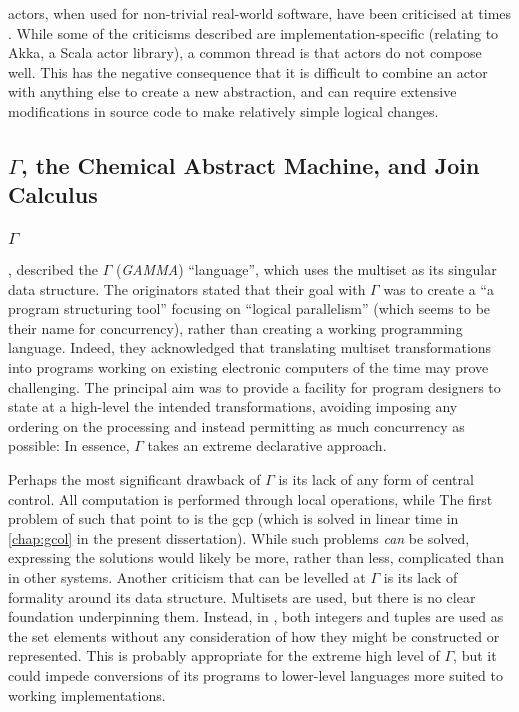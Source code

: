\Glspl{actor}, when used for non-trivial real-world software, have been criticised at times \eg{} \cite{Welsh2013,Stucchio2013}.  While some of the criticisms described are implementation-specific (relating to Akka, a Scala \gls{actor} library), a common thread is that \glspl{actor} do not compose well.  This has the negative consequence that it is difficult to combine an \gls{actor} with anything else to create a new abstraction, and can require extensive modifications in source code to make relatively simple logical changes.

\subsection[GAMMA, the Chemical Abstract Machine, and Join Calculus]{\(\Gamma\), the Chemical Abstract Machine, and Join Calculus}

\subsubsection{\(\Gamma\)}
\citeauthor{Banatre1993} \cite{Banatre1993}, described the \(\Gamma\) (\emph{GAMMA}) ``language'', which uses the multiset as its singular data structure.  The originators stated that their goal with \(\Gamma\) was to create a \enquote{a program structuring tool} focusing on \enquote{logical parallelism} (which seems to be their name for concurrency), rather than creating a working programming language.  Indeed, they acknowledged that translating multiset transformations into programs working on existing electronic computers of the time may prove challenging.  The principal aim was to provide a facility for program designers to state at a high-level the intended transformations, avoiding imposing any ordering on the processing and instead permitting as much concurrency as possible:    In essence, \(\Gamma\) takes an extreme declarative approach.

Perhaps the most significant drawback of \(\Gamma\) is its lack of any form of central control.  All computation is performed through local operations, while   The first problem of such that \citeauthor{Banatre1993} point to is the \gls{gcp} (which is solved in linear time in \cref{chap:gcol} in the present dissertation).  While such problems \emph{can} be solved, expressing the solutions would likely be more, rather than less, complicated than in other systems.  Another criticism that can be levelled at \(\Gamma\) is its lack of formality around its data structure.  Multisets are used, but there is no clear foundation underpinning them.  Instead, in \cite{Banatre1993}, both integers and tuples are used as the set elements without any consideration of how they might be constructed or represented.  This is probably appropriate for the extreme high level of \(\Gamma\), but it could impede conversions of its programs to lower-level languages more suited to working implementations.

